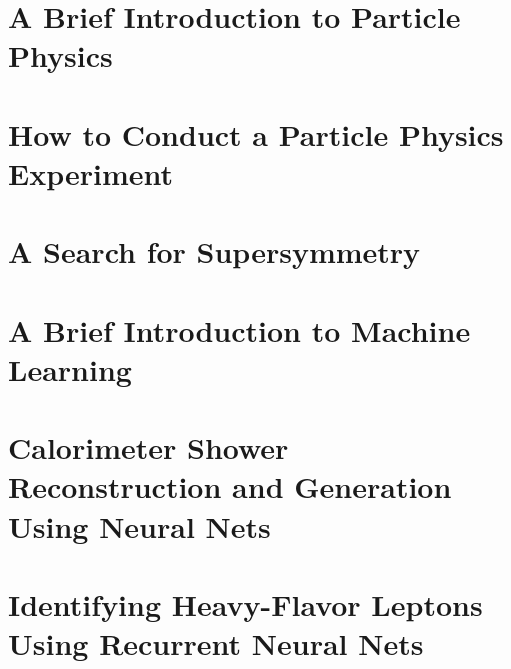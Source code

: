 \documentclass[draftthesis,fancy,edeposit]{uiuc_thesis_template}
\begin{document}



\tableofcontents
\listoftables
\listoffigures

\mainmatter

\part{A Brief Introduction to Particle Physics}



\part{How to Conduct a Particle Physics Experiment}



\part{A Search for Supersymmetry}

\part{A Brief Introduction to Machine Learning}

\part{Calorimeter Shower Reconstruction and Generation Using Neural Nets}







\part{Identifying  Heavy-Flavor  Leptons  Using  Recurrent  Neural Nets}
\end{document}
